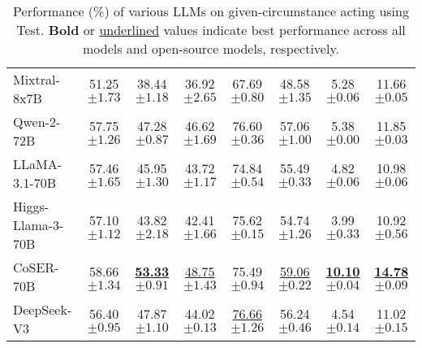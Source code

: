 \begin{table*}[t]
{\begin{tabularx}{\textwidth}{@{}l*{4}{c}ccc@{}}
Mixtral-8x7B & 51.25\scriptsize{$\pm1.73$} & 38.44\scriptsize{$\pm1.18$} & 36.92\scriptsize{$\pm2.65$} & 67.69\scriptsize{$\pm0.80$} & 48.58\scriptsize{$\pm1.35$} & 5.28\scriptsize{$\pm0.06$} & 11.66\scriptsize{$\pm0.05$} \\
Qwen-2-72B & 57.75\scriptsize{$\pm1.26$} & 47.28\scriptsize{$\pm0.87$} & 46.62\scriptsize{$\pm1.69$} & 76.60\scriptsize{$\pm0.36$} & 57.06\scriptsize{$\pm1.00$} & 5.38\scriptsize{$\pm0.00$} & 11.85\scriptsize{$\pm0.03$} \\
LLaMA-3.1-70B & 57.46\scriptsize{$\pm1.65$} & 45.95\scriptsize{$\pm1.30$} & 43.72\scriptsize{$\pm1.17$} & 74.84\scriptsize{$\pm0.54$} & 55.49\scriptsize{$\pm0.33$} & 4.82\scriptsize{$\pm0.06$} & 10.98\scriptsize{$\pm0.06$} \\
Higgs-Llama-3-70B & 57.10\scriptsize{$\pm1.12$} & 43.82\scriptsize{$\pm2.18$} & 42.41\scriptsize{$\pm1.66$} & 75.62\scriptsize{$\pm0.15$} & 54.74\scriptsize{$\pm1.26$} & 3.99\scriptsize{$\pm0.33$} & 10.92\scriptsize{$\pm0.56$} \\
CoSER-70B & 58.66\scriptsize{$\pm1.34$} & \underline{\textbf{53.33\scriptsize{$\pm0.91$}}} & \underline{48.75\scriptsize{$\pm1.43$}} & 75.49\scriptsize{$\pm0.94$} & \underline{59.06\scriptsize{$\pm0.22$}} & \underline{\textbf{10.10\scriptsize{$\pm0.04$}}} & \underline{\textbf{14.78\scriptsize{$\pm0.09$}}} \\
DeepSeek-V3 & 56.40\scriptsize{$\pm0.95$} & 47.87\scriptsize{$\pm1.10$} & 44.02\scriptsize{$\pm0.13$} & \underline{76.66\scriptsize{$\pm1.26$}} & 56.24\scriptsize{$\pm0.46$} & 4.54\scriptsize{$\pm0.14$} & 11.02\scriptsize{$\pm0.15$} \\
\bottomrule
\end{tabularx}
}
\caption{Performance (\%) of various LLMs on given-circumstance acting using \method Test. 
\textbf{Bold} or \underline{underlined} values indicate best  performance across all models and open-source models, respectively. 
}
\label{tab:model-comparison}
\end{table*}
